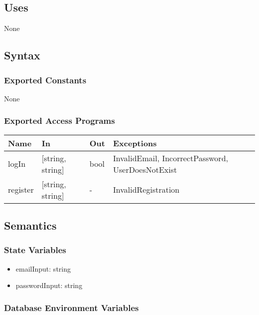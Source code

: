 \documentclass[12pt, titlepage]{article}
\begin{document}
\subsection{Uses}

None

\subsection{Syntax}

\subsubsection{Exported Constants}

None

\subsubsection{Exported Access Programs}

\begin{center}
\begin{tabular}{p{2cm} p{4cm} p{2cm} p{4cm}}
\hline
\textbf{Name} & \textbf{In} & \textbf{Out} & \textbf{Exceptions} \\
\hline
logIn & [string, string] & bool & InvalidEmail, IncorrectPassword, UserDoesNotExist \\
register & [string, string] & - & InvalidRegistration \\
\hline
\end{tabular}
\end{center}

\subsection{Semantics}

\subsubsection{State Variables}

\begin{itemize}
    \item emailInput: string
    \item passwordInput: string
\end{itemize}

\subsubsection{Database Environment Variables}
\end{document}
